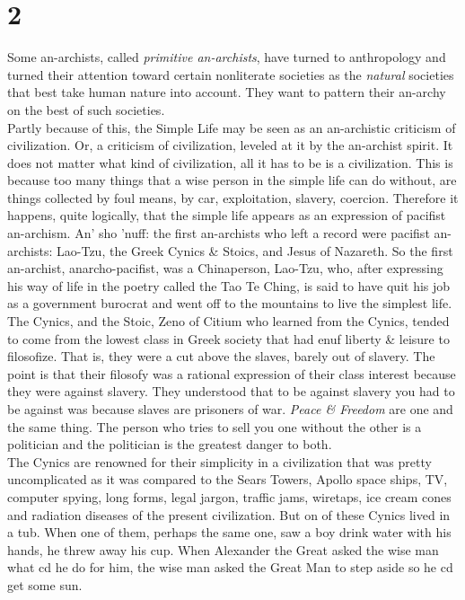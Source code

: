 \documentclass[12pt, onecolumn, letterpaper, oneside]{book}
\begin{document}
\section*{2}
Some an-archists, called \emph{primitive an-archists}, have turned to anthropology and turned their attention toward certain nonliterate societies as the \emph{natural} societies that best take human nature into account. They want to pattern their an-archy on the best of such societies.\\
Partly because of this, the Simple Life may be seen as an an-archistic criticism of civilization. Or, a criticism of civilization, leveled at it by the an-archist spirit. It does not matter what kind of civilization, all it has to be is a civilization. This is because too many things that a wise person in the simple life can do without, are things collected by foul means, by car, exploitation, slavery, coercion. Therefore it happens, quite logically, that the simple life appears as an expression of pacifist an-archism. An' sho 'nuff: the first an-archists who left a record were pacifist an-archists: Lao-Tzu, the Greek Cynics \& Stoics, and Jesus of Nazareth. So the first an-archist, anarcho-pacifist, was a Chinaperson, Lao-Tzu, who, after expressing his way of life in the poetry called the Tao Te Ching, is said to have quit his job as a government burocrat and went off to the mountains to live the simplest life.\\
The Cynics, and the Stoic, Zeno of Citium who learned from the Cynics, tended to come from the lowest class in Greek society that had enuf liberty \& leisure to filosofize. That is, they were a cut above the slaves, barely out of slavery. The point is that their filosofy was a rational expression of their class interest because they were against slavery. They understood that to be against slavery you had to be against was because slaves are prisoners of war. \emph{Peace \& Freedom} are one and the same thing. The person who tries to sell you one without the other is a politician and the politician is the greatest danger to both.\\
The Cynics are renowned for their simplicity in a civilization that was pretty uncomplicated as it was compared to the Sears Towers, Apollo space ships, TV, computer spying, long forms, legal jargon, traffic jams, wiretaps, ice cream cones and radiation diseases of the present civilization. But on of these Cynics lived in a tub. When one of them, perhaps the same one, saw a boy drink water with his hands, he threw away his cup. When Alexander the Great asked the wise man what cd he do for him, the wise man asked the Great Man to step aside so he cd get some sun.\\
\end{document}
